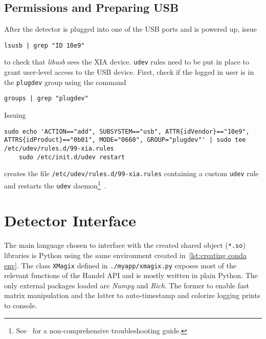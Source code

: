         \subsection{Permissions and Preparing USB}
            After the detector is plugged into one of the USB ports and is powered up, issue
            \begin{lstlisting}[style=mybash, numbers=none, label={lst:lsusb}]
    lsusb | grep "ID 10e9"
            \end{lstlisting}
            to check that \textit{libusb} sees the XIA device.
            \texttt{udev} rules need to be put in place to grant user-level access to the USB device.
            First, check if the logged in user is in the \texttt{plugdev} group using the command
            \begin{lstlisting}[style=mybash, numbers=none, label={lst:udev}]
    groups | grep "plugdev"
            \end{lstlisting}
            Issuing
            \begin{lstlisting}[style=mybash, numbers=none, label={lst:udev}]
    sudo echo 'ACTION=="add", SUBSYSTEM=="usb", ATTR{idVendor}=="10e9", ATTRS{idProduct}=="0b01", MODE="0660", GROUP="plugdev"' | sudo tee /etc/udev/rules.d/99-xia.rules
    sudo /etc/init.d/udev restart
            \end{lstlisting}
            creates the file \texttt{/etc/udev/rules.d/99-xia.rules} containing a custom \texttt{udev} rule and restarts the \texttt{udev} daemon\footnote{See~\cite{Software.XraythesisHandel.2023} for a non-comprehensive troubleshooting guide.}~\cite{Software.HandelRelease.2023,Software.XraythesisHandel.2023}.

    \section{Detector Interface}
        The main language chosen to interface with the created shared object (\texttt{*.so}) libraries is Python using the same environment created in~\cref{lst:creating conda env}.
        The class \texttt{XMagix} defined in \texttt{./myapp/xmagix.py} exposes most of the relevant functions of the Handel API and is mostly written in plain Python.
        The only external packages loaded are \textit{Numpy} and \textit{Rich}.
        The former to enable fast matrix manipulation and the latter to auto-timestamp and colorize logging prints to console.\par\medskip

